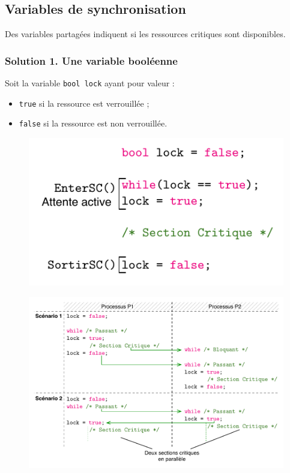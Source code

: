 \documentclass[11pt,english,french]{scrreprt}
\theoremstyle{remark}
\theoremstyle{definition}
\begin{document}
\subsection{Variables de synchronisation}
Des variables partagées indiquent si les ressources critiques sont disponibles.

\subsubsection{Solution 1. Une variable booléenne}
Soit la variable \lstinline!bool lock! ayant pour valeur :\begin{itemize}
	\item \lstinline!true! si la ressource est verrouillée ;
	\item \lstinline!false! si la ressource est non verrouillée.
\end{itemize}

\begin{figure}[h!]
	\center
	\includegraphics[scale=.85]{img/SC-bool}
\end{figure}

\begin{figure}[h!]
	\center
	\includegraphics[scale=.85]{img/SC-bool-scenario}
\end{figure}
\end{document}
